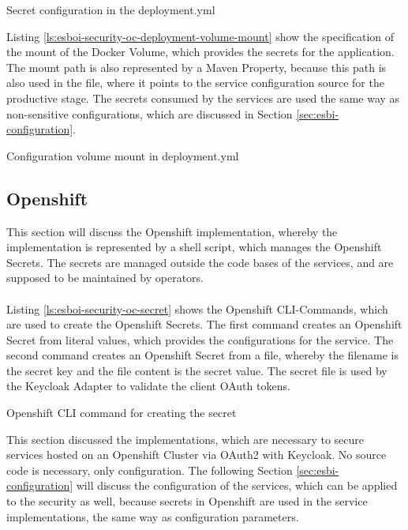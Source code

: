 \begin{listing}[h]
	\caption{Secret configuration in the deployment.yml}
	\label{ls:esboi-security-oc-deployment-volume-secret}
\end{listing}

Listing \vref{ls:esboi-security-oc-deployment-volume-mount} show the specification of the mount of the Docker Volume, which provides the secrets for the application. The mount path is also represented by a Maven Property, because this path is also used in the  file, where it points to the service configuration source for the productive stage. The secrets consumed by the services are used the same way as non-sensitive configurations, which are discussed in Section \vref{sec:esbi-configuration}.

\begin{listing}[h]
	\caption{Configuration volume mount in deployment.yml}
	\label{ls:esboi-security-oc-deployment-volume-mount}
\end{listing}

\subsection{Openshift}
\label{sec:esbi-security-openshift}
This section will discuss the Openshift implementation, whereby the implementation is represented by a shell script, which manages the Openshift Secrets. The secrets are managed outside the code bases of the services, and are supposed to be maintained by operators.
\\ \\
Listing \vref{ls:esboi-security-oc-secret} shows the Openshift CLI-Commands, which are used to create the Openshift Secrets. The first command creates an Openshift Secret from literal values, which provides the configurations for the service. The second command creates an Openshift Secret from a file, whereby the filename is the secret key and the file content is the secret value. The secret file is used by the Keycloak Adapter to validate the client OAuth tokens. 
\newpage 

\begin{listing}[h]
	\caption{Openshift CLI command for creating the secret}
	\label{ls:esboi-security-oc-secret}
\end{listing}

This section discussed the implementations, which are necessary to secure services hosted on an Openshift Cluster via OAuth2 with Keycloak. No source code is necessary, only configuration. The following Section \vref{sec:esbi-configuration} will discuss the configuration of the services, which can be applied to the security as well, because secrets in Openshift are used in the service implementations, the same way as configuration parameters.

